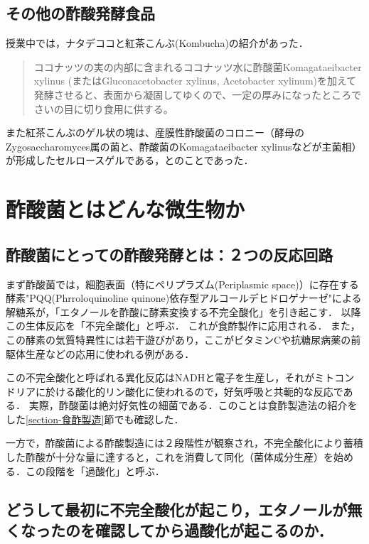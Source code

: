 \documentclass[uplatex, dvipdfmx]{jsarticle}
\begin{document}
\subsection{その他の酢酸発酵食品}

授業中では，ナタデココと紅茶こんぶ(Kombucha)の紹介があった．
\begin{quote}
    ココナッツの実の内部に含まれるココナッツ水に酢酸菌Komagataeibacter xylinus (またはGluconacetobacter xylinus, Acetobacter xylinum)を加えて発酵させると、表面から凝固してゆくので、一定の厚みになったところでさいの目に切り食用に供する。
\end{quote}
また紅茶こんぶのゲル状の塊は、産膜性酢酸菌のコロニー（酵母のZygosaccharomyces属の菌と、酢酸菌のKomagataeibacter xylinusなどが主菌相）が形成したセルロースゲルである，とのことであった．

\section{酢酸菌とはどんな微生物か}

\subsection{酢酸菌にとっての酢酸発酵とは：２つの反応回路}

まず酢酸菌では，細胞表面（特にペリプラズム(Periplasmic space)）に存在する酵素"PQQ(Phrroloquinoline quinone)依存型アルコールデヒドロゲナーゼ"による解糖系が，「エタノールを酢酸に酵素変換する不完全酸化」を引き起こす．
以降この生体反応を「不完全酸化」と呼ぶ．
これが食酢製作に応用される．
また，この酵素の気質特異性には若干遊びがあり，ここがビタミンCや抗糖尿病薬の前駆体生産などの応用に使われる例がある．

この不完全酸化と呼ばれる異化反応はNADHと電子を生産し，それがミトコンドリアに於ける酸化的リン酸化に使われるので，好気呼吸と共軛的な反応である．
実際，酢酸菌は絶対好気性の細菌である．このことは食酢製造法の紹介をした\ref{section-食酢製造}節でも確認した．

一方で，酢酸菌による酢酸製造には２段階性が観察され，不完全酸化により蓄積した酢酸が十分な量に達すると，これを消費して同化（菌体成分生産）を始める．この段階を「過酸化」と呼ぶ．

\subsection{どうして最初に不完全酸化が起こり，エタノールが無くなったのを確認してから過酸化が起こるのか．}
\end{document}

